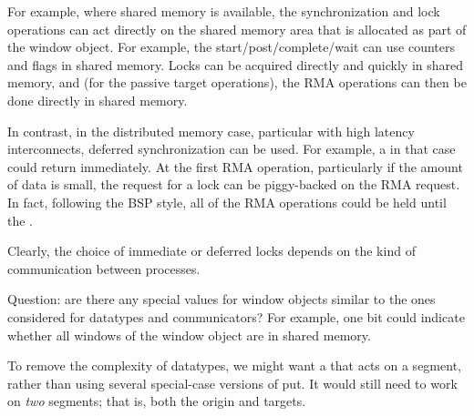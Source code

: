 \documentclass{article}
\begin{document}
For example, where shared memory is available, the synchronization and
lock operations can act directly on the shared memory area that is
allocated as part of the window object.  For example, the
start/post/complete/wait can use counters and flags in shared memory.
Locks can be acquired directly and quickly in shared memory, and (for
the passive target operations), the RMA operations can then be done
directly in shared memory.

In contrast, in the distributed memory case, particular with high
latency interconnects, deferred synchronization can be used.  For
example, a  in that case could return immediately.
At the first RMA operation, particularly if the amount of data is
small, the request for a lock can be piggy-backed on the RMA request.
In fact, following the BSP style, all of the RMA operations could be
held until the .

Clearly, the choice of immediate or deferred locks depends on the kind
of communication between processes.

Question: are there any special values for window objects similar to the ones
considered for datatypes and communicators?  For example, one bit could
indicate whether all windows of the window object are in shared memory.

To remove the complexity of datatypes, we might want a
 that acts on a segment, rather than using several
special-case versions of put.  It would still need to work on \emph{two}
segments; that is, both the origin and targets.
\end{document}
